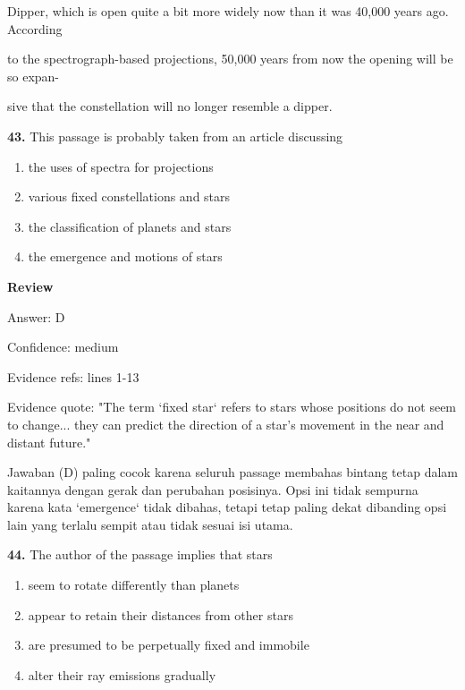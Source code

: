\documentclass[12pt]{article}
\begin{document}
Dipper, which is open quite a bit more widely now than it was 40,000 years ago. According\par
to the spectrograph-based projections, 50,000 years from now the opening will be so expan-\par
sive that the constellation will no longer resemble a dipper.\par
\endgroup
\medskip
\noindent\textbf{43.} This passage is probably taken from an article discussing
\begin{enumerate}[label=(\Alph*),leftmargin=*,itemsep=0.2em]
\item the uses of spectra for projections
\item various fixed constellations and stars
\item the classification of planets and stars
\item the emergence and motions of stars
\end{enumerate}
\par
\begingroup
\setlength{\parskip}{0pt}
\setlength{\parindent}{0pt}
\textbf{Review}\par
Answer: D\par
Confidence: medium\par
Evidence refs: lines 1-13\par
Evidence quote: "The term `fixed star` refers to stars whose positions do not seem to change... they can predict the direction of a star's movement in the near and distant future."\par
Jawaban (D) paling cocok karena seluruh passage membahas bintang tetap dalam kaitannya dengan gerak dan perubahan posisinya. Opsi ini tidak sempurna karena kata `emergence` tidak dibahas, tetapi tetap paling dekat dibanding opsi lain yang terlalu sempit atau tidak sesuai isi utama.\par
\endgroup
\par
\vspace{0.25\baselineskip}
\noindent\textbf{44.} The author of the passage implies that stars
\begin{enumerate}[label=(\Alph*),leftmargin=*,itemsep=0.2em]
\item seem to rotate differently than planets
\item appear to retain their distances from other stars
\item are presumed to be perpetually fixed and immobile
\item alter their ray emissions gradually
\end{enumerate}
\par
\end{document}
